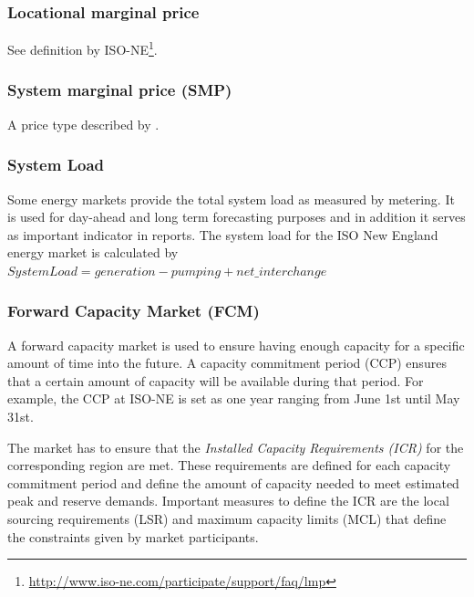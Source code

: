 \subsubsection{Locational marginal price}

See definition by ISO-NE\footnote{\url{http://www.iso-ne.com/participate/support/faq/lmp}}. 


\subsubsection{System marginal price (SMP)}

A price type described by \cite{szkuta1999electricity}. 

\subsubsection{System Load}


Some energy markets provide the total system load as measured by metering. It is used for day-ahead and long term forecasting purposes and in addition it serves as important indicator in reports. The system load for the ISO New England energy market is calculated by $System Load = generation - pumping + net\_interchange$


\subsubsection{Forward Capacity Market (FCM)} 

A forward capacity market is used to ensure having enough capacity for a specific amount of time into the future. A capacity commitment period (CCP) ensures that a certain amount of capacity will be available during that period. For example, the CCP at ISO-NE is set as one year ranging from June 1st until May 31st. 

The market has to ensure that the \emph{Installed Capacity Requirements (ICR)} for the corresponding region are met. These requirements are defined for each capacity commitment period and define the amount of capacity needed to meet estimated peak and reserve demands. Important measures to define the ICR are the local sourcing requirements (LSR) and maximum capacity limits (MCL) that define the constraints given by market participants. %


